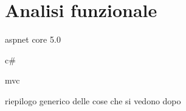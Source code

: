 \section{Analisi funzionale}
aspnet core 5.0 

c\#

mvc

riepilogo generico delle cose che si vedono dopo